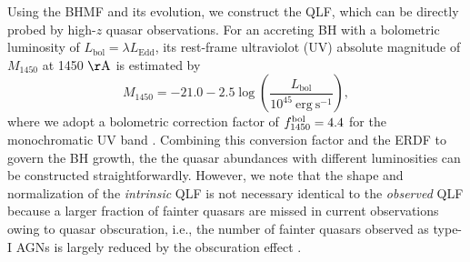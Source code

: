 \documentclass[twocolumn, twocolappendix]{aastex63}
\newcommand{\Muv}{M_{1450}}
\newcommand{\Lbol}{L_\mathrm{bol}}
\begin{document}
\begin{CJK*}{UTF8}{gbsn}
Using the BHMF and its evolution, we construct the QLF, which can be directly probed by high-$z$ quasar observations.
For an accreting BH with a bolometric luminosity of $\Lbol=\lambda L_\mathrm{Edd}$, 
its rest-frame ultraviolot (UV) absolute magnitude of $\Muv$ at 1450 $\mathrm{\AA}$ is estimated by
\begin{equation}
  \label{eq:M1450}
  \Muv= -21.0-2.5 \log  \left(\frac{\Lbol}{10^{45}~\mathrm{erg~s}^{-1}} \right),
\end{equation}
%
where we adopt a bolometric correction factor of $f^{\rm bol}_{1450}=4.4$ for the monochromatic UV band 
\citep{2006ApJS..166..470R}.
Combining this conversion factor and the ERDF to govern the BH growth, the the quasar abundances with different luminosities 
can be constructed straightforwardly.
However, we note that the shape and normalization of the {\it intrinsic} QLF is not necessary identical to the {\it observed} QLF
because a larger fraction of fainter quasars are missed in current observations owing to quasar obscuration, 
i.e., the number of fainter quasars observed as type-I AGNs is largely reduced by the obscuration effect
\citep{2003ApJ...598..886U,2014ApJ...786..104U,2008A&A...490..905H,2014MNRAS.437.3550M}. 



\end{CJK*}
\end{document}
